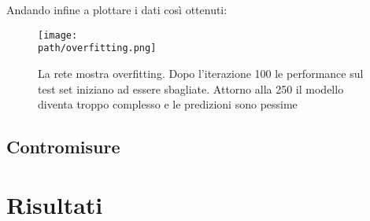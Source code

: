 Andando infine a plottare i dati così ottenuti: 
\begin{figure}[h!]
 \centering
 \texttt{[image: \\path/overfitting.png]}
 \caption{La rete mostra overfitting. Dopo l'iterazione 100 le performance sul test set iniziano ad essere sbagliate. Attorno alla 250 il modello diventa troppo complesso e le predizioni sono pessime}
 \label{fig:overfitting}
\end{figure}

\subsection{Contromisure}



\section{Risultati}
